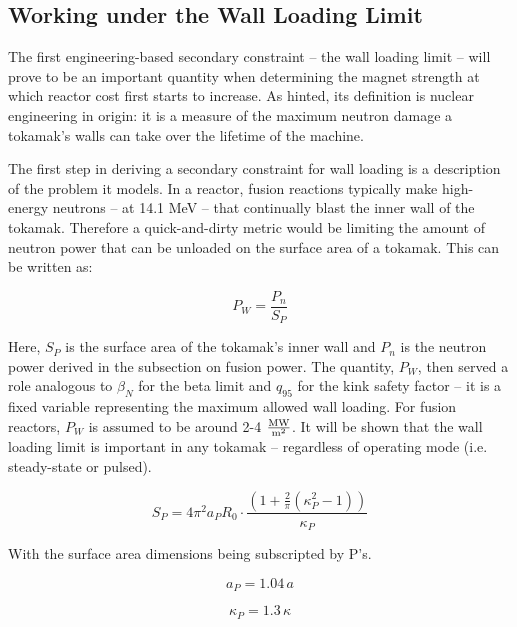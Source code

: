 \documentclass[11pt]{book}
\begin{document}
\subsection{Working under the Wall Loading Limit}

The first engineering-based secondary constraint -- the wall loading limit -- will prove to be an important quantity when determining the magnet strength at which reactor cost first starts to increase. As hinted, its definition is nuclear engineering in origin: it is a measure of the maximum neutron damage a tokamak's walls can take over the lifetime of the machine.

The first step in deriving a secondary constraint for wall loading is a description of the problem it models. In a reactor, fusion reactions typically make high-energy neutrons -- at 14.1 MeV -- that continually blast the inner wall of the tokamak. Therefore a quick-and-dirty metric would be limiting the amount of neutron power that can be unloaded on the surface area of a tokamak. This can be written as:

\begin{equation}
	P_W = \frac{ P_n }{ S_P }
\end{equation}

Here, $S_P$ is the surface area of the tokamak's inner wall and $P_n$ is the neutron power derived in the subsection on fusion power. The quantity, $P_W$, then served a role analogous to $\beta_N$ for the beta limit and $q_{95}$ for the kink safety factor -- it is a fixed variable representing the maximum allowed wall loading. For fusion reactors, $P_W$ is assumed to be around 2-4 $\frac{\textnormal{MW}}{\textnormal{m}^2}$. It will be shown that the wall loading limit is important in any tokamak -- regardless of operating mode (i.e. steady-state or pulsed).

\begin{equation}
	S_P = 4 \pi^2 a_P R_0 \cdot \frac{ \left( 1 + \frac{2}{\pi} \left( \kappa_P^2 -1 \right) \right) }{ \kappa_P }
\end{equation}

With the surface area dimensions being subscripted by P's.

\begin{equation}
	a_P = 1.04 \, a
\end{equation}

\begin{equation}
	\kappa_P = 1.3 \, \kappa
\end{equation}
\end{document}
